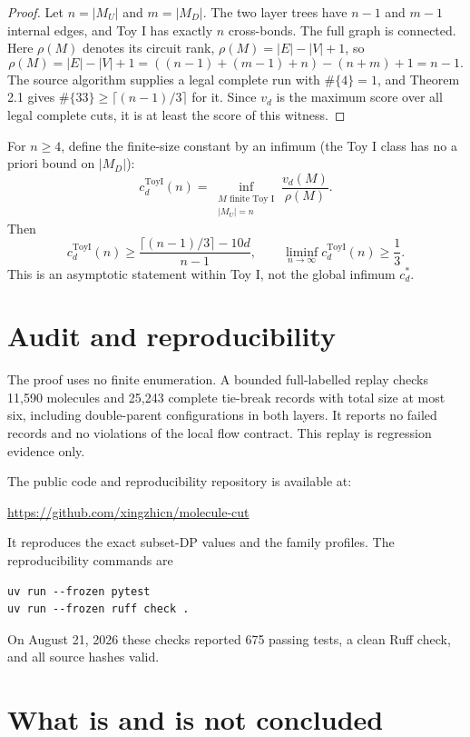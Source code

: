 \documentclass[12pt]{article}
\newcommand{\good}{\#\{33\}}
\newcommand{\bad}{\#\{4\}}
\newcommand{\MU}{M_U}
\newcommand{\MD}{M_D}
\newcommand{\ToyI}{\mathrm{ToyI}}
\begin{document}
\begin{proof}
Let \(n=|\MU|\) and \(m=|\MD|\).  The two layer trees have \(n-1\) and
\(m-1\) internal edges, and Toy I has exactly \(n\) cross-bonds.  The full
graph is connected.  Here \(\rho(M)\) denotes its circuit rank,
\(\rho(M)=|E|-|V|+1\), so
\[
 \rho(M)=|E|-|V|+1=((n-1)+(m-1)+n)-(n+m)+1=n-1.
\]
The source algorithm supplies a legal complete run with \(\bad=1\), and
Theorem 2.1 gives \(\good\ge\lceil(n-1)/3\rceil\) for it.  Since \(v_d\) is
the maximum score over all legal complete cuts, it is at least the score of
this witness.\end{proof}

For \(n\ge4\), define the finite-size constant by an infimum (the Toy I
class has no a priori bound on \(|\MD|\)):
\[
 c_d^{\ToyI}(n)=\inf_{\substack{M\text{ finite Toy I}\\|\MU|=n}}
 \frac{v_d(M)}{\rho(M)}.
\]
Then
\[
 c_d^{\ToyI}(n)\ge
 \frac{\lceil(n-1)/3\rceil-10d}{n-1},
 \qquad
 \liminf_{n\to\infty}c_d^{\ToyI}(n)\ge\frac13. \tag{4.2}
\]
This is an asymptotic statement within Toy I, not the global infimum \(c_d^*\).

\section{Audit and reproducibility}

The proof uses no finite enumeration.  A bounded full-labelled replay checks
11,590 molecules and 25,243 complete tie-break records with total size at most
six, including double-parent configurations in both layers.  It reports no
failed records and no violations of the local flow contract.  This replay is
regression evidence only.

The public code and reproducibility repository is available at:
\begin{center}
\url{https://github.com/xingzhicn/molecule-cut}
\end{center}
It reproduces the exact subset-DP values and the family profiles.  The
reproducibility commands are
\begin{verbatim}
uv run --frozen pytest
uv run --frozen ruff check .
\end{verbatim}
On August 21, 2026 these checks reported 675 passing tests, a clean Ruff check,
and all source hashes valid.

\section{What is and is not concluded}
\end{document}
